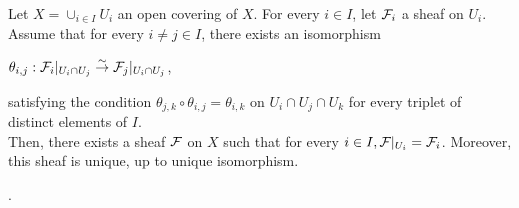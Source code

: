 \begin{myprop} \label{patching_sheaf}
Let $X = \cup_{i\in I} U_i$ an open covering of $X$. For every $i\in I$, let $\mathcal{F}_i$ a sheaf on $U_i$.\\
Assume that for every $i \neq j \in I$, there exists an isomorphism 
\begin{center}
$\theta_{i,j} : \mathcal{F}_i|_{U_i \cap U_j} \overset{\sim}{\to} \mathcal{F}_j|_{U_i \cap U_j}$,
\end{center}
satisfying the condition $\theta_{j,k} \circ \theta _{i,j} = \theta_{i,k}$ on $U_i \cap U_j \cap U_k$ for every triplet of distinct elements of $I$.\\
Then, there exists a sheaf $\mathcal{F}$ on $X$ such that for every $i\in I, \mathcal{F}|_{U_i} = \mathcal{F}_i$. Moreover, this sheaf is unique, up to unique isomorphism.
\end{myprop}

\begin{mydemo}
.
\end{mydemo}